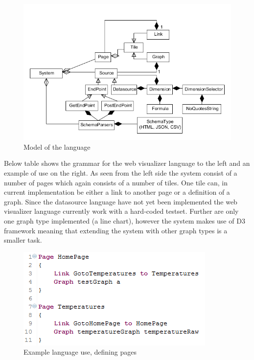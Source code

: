 \begin{figure}
\begin{center}
\includegraphics[width=\linewidth]{images/languagemodel}
\end{center}
\caption{Model of the language}
\label{fig:languagemodel}
\end{figure}



Below table shows the grammar for the web visualizer language to the left and an example of use on the right. 
As seen from the left side the system consist of a number of pages which again consists of a number of tiles. 
One tile can, in current implementation be either a link to another page or a definition of a graph. 
Since the datasource language have not yet been implemented the web visualizer language currently work with a hard-coded testset. 
Further are only one graph type implemented (a line chart), however the system makes use of D3 framework meaning that extending the system with other graph types is a smaller task.

\begin{figure}
\begin{center}
\includegraphics[width=\linewidth]{images/ExampleUsePages}
\end{center}
\caption{Example language use, defining pages}
\label{fig:examplePages}
\end{figure}

